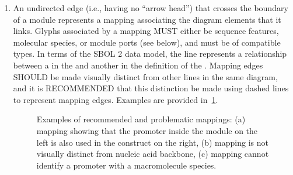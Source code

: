 {\begin{enumerate}
\item An undirected edge (i.e., having no ``arrow head'') that crosses the boundary of a module represents a mapping associating the diagram elements that it links. 
Glyphs associated by a mapping MUST either be sequence features, molecular species, or module ports (see below), and must be of compatible types.
In terms of the SBOL 2 data model, the line represents a  relationship between a  in the  and another  in the definition of the .
	Mapping edges SHOULD be made visually distinct from other lines in the same diagram, and it is RECOMMENDED that this distinction be made using dashed lines to represent mapping edges.
	Examples are provided in~\ref{exa:moduleB}.

	\begin{figure}[h!]
	\centering
	\caption{Examples of recommended and problematic mappings: (a) mapping showing that the promoter inside the module on the left is also used in the construct on the right, (b) mapping is not visually distinct from nucleic acid backbone, (c) mapping cannot identify a promoter with a macromolecule species.}
	\label{exa:moduleB}
	\end{figure}


\end{enumerate}}
